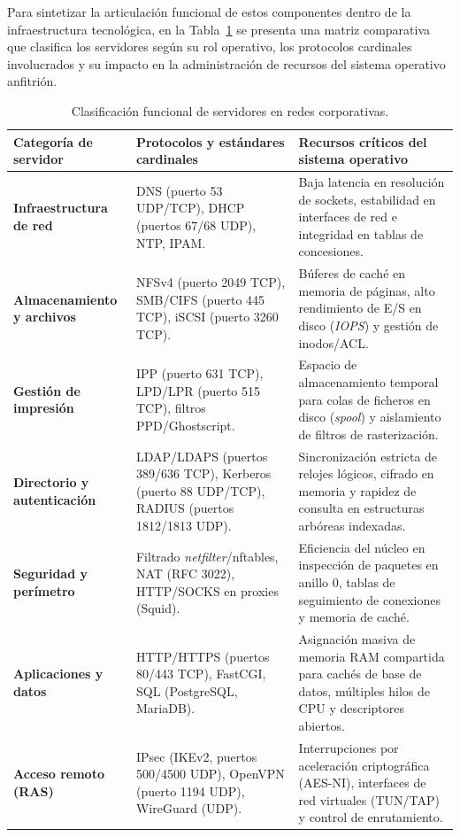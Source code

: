 \documentclass[12pt]{article}
\begin{document}
Para sintetizar la articulación funcional de estos componentes dentro de la infraestructura tecnológica, en la Tabla~\ref{tab:clasificacionServidores} se presenta una matriz comparativa que clasifica los servidores según su rol operativo, los protocolos cardinales involucrados y su impacto en la administración de recursos del sistema operativo anfitrión.

\begin{table}[H]
\centering
\small
\renewcommand{\arraystretch}{1.15}
\renewcommand{\tabularxcolumn}[1]{m{#1}}
\setlength{\emergencystretch}{1.5em}
\caption{Clasificación funcional de servidores en redes corporativas.}
\label{tab:clasificacionServidores}
\begin{tabularx}{\textwidth}{>{\centering\arraybackslash}m{3.1cm} X X}
\toprule
\textbf{Categoría de servidor} & \textbf{Protocolos y estándares cardinales} & \textbf{Recursos críticos del sistema operativo} \\
\midrule
\textbf{Infraestructura de red} & DNS (puerto 53 UDP/TCP), DHCP (puertos 67/68 UDP), NTP, IPAM. & Baja latencia en resolución de sockets, estabilidad en interfaces de red e integridad en tablas de concesiones. \\
\addlinespace
\textbf{Almacenamiento y archivos} & NFSv4 (puerto 2049 TCP), SMB/CIFS (puerto 445 TCP), iSCSI (puerto 3260 TCP). & Búferes de caché en memoria de páginas, alto rendimiento de E/S en disco (\textit{IOPS}) y gestión de inodos/ACL. \\
\addlinespace
\textbf{Gestión de impresión} & IPP (puerto 631 TCP), LPD/LPR (puerto 515 TCP), filtros PPD/Ghostscript. & Espacio de almacenamiento temporal para colas de ficheros en disco (\textit{spool}) y aislamiento de filtros de rasterización. \\
\addlinespace
\textbf{Directorio y autenticación} & LDAP/LDAPS (puertos 389/636 TCP), Kerberos (puerto 88 UDP/TCP), RADIUS (puertos 1812/1813 UDP). & Sincronización estricta de relojes lógicos, cifrado en memoria y rapidez de consulta en estructuras arbóreas indexadas. \\
\addlinespace
\textbf{Seguridad y perímetro} & Filtrado \textit{netfilter}/nftables, NAT (RFC 3022), HTTP/SOCKS en proxies (Squid). & Eficiencia del núcleo en inspección de paquetes en anillo 0, tablas de seguimiento de conexiones y memoria de caché. \\
\addlinespace
\textbf{Aplicaciones y datos} & HTTP/HTTPS (puertos 80/443 TCP), FastCGI, SQL (PostgreSQL, MariaDB). & Asignación masiva de memoria RAM compartida para cachés de base de datos, múltiples hilos de CPU y descriptores abiertos. \\
\addlinespace
\textbf{Acceso remoto (RAS)} & IPsec (IKEv2, puertos 500/4500 UDP), OpenVPN (puerto 1194 UDP), WireGuard (UDP). & Interrupciones por aceleración criptográfica (AES-NI), interfaces de red virtuales (TUN/TAP) y control de enrutamiento. \\
\bottomrule
\end{tabularx}
\end{table}
\end{document}
